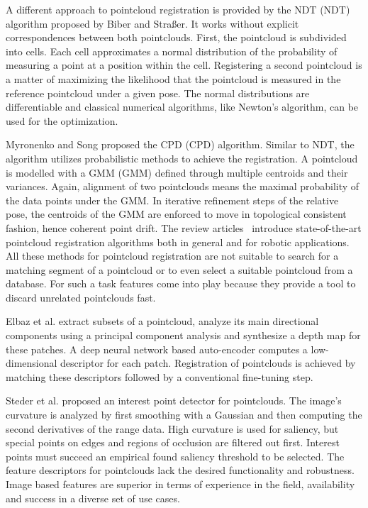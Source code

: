A different approach to pointcloud registration is provided by the \acrlong{NDT} (\acrshort{NDT}) algorithm proposed by Biber and Straßer\cite{biber_iros2003}.
It works without explicit correspondences between both pointclouds.
First, the pointcloud is subdivided into cells.
Each cell approximates a normal distribution of the probability of measuring a point at a position within the cell.
Registering a second pointcloud is a matter of maximizing the likelihood that the pointcloud is measured in the reference pointcloud under a given pose.
The normal distributions are differentiable and classical numerical algorithms, like Newton's algorithm, can be used for the optimization.

Myronenko and Song\cite{myronenko_ieee2010} proposed the \acrlong{CPD} (\acrshort{CPD}) algorithm.
Similar to \acrshort{NDT}, the algorithm utilizes probabilistic methods to achieve the registration.
A pointcloud is modelled with a \acrlong{GMM} (\acrshort{GMM}) defined through multiple centroids and their variances.
Again, alignment of two pointclouds means the maximal probability of the data points under the \acrshort{GMM}.
In iterative refinement steps of the relative pose, the centroids of the \acrshort{GMM} are enforced to move in topological consistent fashion, hence coherent point drift.
The review articles~\cite{bellekens_ambient2014,pomerleau_2015} introduce state-of-the-art pointcloud registration algorithms both in general and for robotic applications.
All these methods for pointcloud registration are not suitable to search for a matching segment of a pointcloud or to even select a suitable pointcloud from a database.
For such a task features come into play because they provide a tool to discard unrelated pointclouds fast.

Elbaz et al.\cite{elbaz_cvpr2017} extract subsets of a pointcloud, analyze its main directional components using a principal component analysis and synthesize a depth map for these patches.
A deep neural network based auto-encoder computes a low-dimensional descriptor for each patch.
Registration of pointclouds is achieved by matching these descriptors followed by a conventional fine-tuning step.

Steder et al.\cite{steder_robot2010} proposed an interest point detector for pointclouds.
The image's curvature is analyzed by first smoothing with a Gaussian and then computing the second derivatives of the range data.
High curvature is used for saliency, but special points on edges and regions of occlusion are filtered out first.
Interest points must succeed an empirical found saliency threshold to be selected.
The feature descriptors for pointclouds lack the desired functionality and robustness.
Image based features are superior in terms of experience in the field, availability and success in a diverse set of use cases\cite{lynen_ros2015,sivic_pami2009,aqel_2016}.

